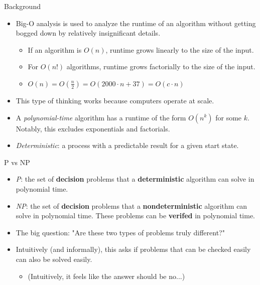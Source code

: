 \documentclass[aspectratio=169, handout]{beamer}
\begin{document}
\begin{frame}{Background}
    \begin{itemize}
        \item Big-O analysis is used to analyze the runtime of an algorithm without getting bogged down by relatively insignificant details. \pause
        \begin{itemize}
            \item If an algorithm is \emph{$O(n)$}, runtime grows linearly to the size of the input. \pause
            \item For \emph{$O(n!)$} algorithms, runtime grows factorially to the size of the input. \pause
            \item $O(n) = O(\frac{n}{2}) = O(2000 \cdot n + 37) = O(c \cdot n)$ \pause
        \end{itemize}
        \item This type of thinking works because computers operate at scale. \pause
        \item A \emph{polynomial-time} algorithm has a runtime of the form $O(n^k)$ for some $k$. Notably, this excludes exponentials and factorials. \pause
        \item \emph{Deterministic}: a process with a predictable result for a given start state.
    \end{itemize}
\end{frame}


\begin{frame}{P vs NP}
    \begin{itemize}
        \item \emph{P}: the set of \textbf{decision} problems that a \textbf{deterministic} algorithm can solve in polynomial time. \pause
        \item \emph{NP}: the set of \textbf{decision} problems that a \textbf{nondeterministic} algorithm can solve in polynomial time. These problems can be \textbf{verifed} in polynomial time. \pause
        \item The big question: "Are these two types of problems truly different?" \pause
        \item Intuitively (and informally), this asks if problems that can be checked easily can also be solved easily. \pause
        \begin{itemize}
            \item (Intuitively, it feels like the answer should be no...)
        \end{itemize}
    \end{itemize}
\end{frame}
\end{document}
